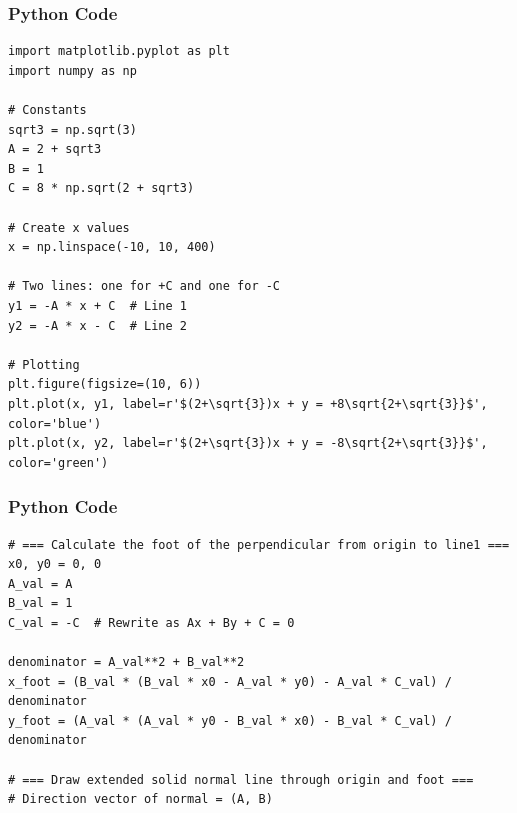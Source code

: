 \documentclass{beamer}
\begin{document}
\begin{frame}[fragile]
    \frametitle{Python Code}
    \begin{lstlisting}
import matplotlib.pyplot as plt
import numpy as np

# Constants
sqrt3 = np.sqrt(3)
A = 2 + sqrt3
B = 1
C = 8 * np.sqrt(2 + sqrt3)

# Create x values
x = np.linspace(-10, 10, 400)

# Two lines: one for +C and one for -C
y1 = -A * x + C  # Line 1
y2 = -A * x - C  # Line 2

# Plotting
plt.figure(figsize=(10, 6))
plt.plot(x, y1, label=r'$(2+\sqrt{3})x + y = +8\sqrt{2+\sqrt{3}}$', color='blue')
plt.plot(x, y2, label=r'$(2+\sqrt{3})x + y = -8\sqrt{2+\sqrt{3}}$', color='green')

\end{lstlisting}
\end{frame}

\begin{frame}[fragile]
    \frametitle{Python Code }

    \begin{lstlisting}
# === Calculate the foot of the perpendicular from origin to line1 ===
x0, y0 = 0, 0
A_val = A
B_val = 1
C_val = -C  # Rewrite as Ax + By + C = 0

denominator = A_val**2 + B_val**2
x_foot = (B_val * (B_val * x0 - A_val * y0) - A_val * C_val) / denominator
y_foot = (A_val * (A_val * y0 - B_val * x0) - B_val * C_val) / denominator

# === Draw extended solid normal line through origin and foot ===
# Direction vector of normal = (A, B)


    \end{lstlisting}
\end{frame}
\end{document}
